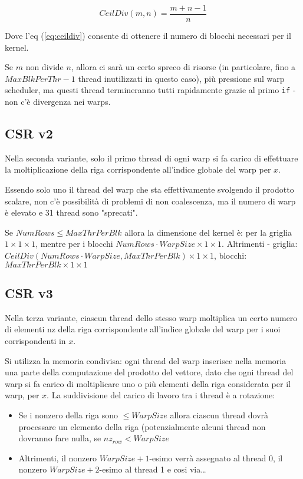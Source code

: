 \documentclass[a4paper,9pt]{extarticle}
\begin{document}
\begin{equation}\label{eq:ceildiv}
CeilDiv(m,n) = \frac{m + n - 1}{n}
\end{equation}

Dove l'eq (\ref{eq:ceildiv}) consente di ottenere il numero di blocchi necessari per il kernel.

Se $m$ non divide $n$, allora ci sarà un certo spreco di risorse 
(in particolare, fino a $MaxBlkPerThr - 1$ thread inutilizzati in questo caso), più pressione sul warp scheduler,
ma questi thread termineranno tutti rapidamente grazie al primo \texttt{if} - non c'è divergenza nei warps.

\subsection{CSR v2}
Nella seconda variante, solo il primo thread di ogni warp si fa carico di effettuare la moltiplicazione della riga 
corrispondente all'indice globale del warp per $x$.

Essendo solo uno il thread del warp che sta effettivamente svolgendo il prodotto scalare, non c'è possibilità di
problemi di non coalescenza, ma il numero di warp è elevato e 31 thread sono "sprecati".

Se $NumRows \le MaxThrPerBlk$ allora la dimensione del kernel è: per la griglia $1 \times 1 \times 1$, mentre per i
blocchi $NumRows \cdot WarpSize \times 1 \times 1$. Altrimenti - griglia: $CeilDiv(NumRows \cdot WarpSize, MaxThrPerBlk) \times 1 \times 1$, blocchi: $MaxThrPerBlk \times 1 \times 1$

\subsection{CSR v3}
Nella terza variante, ciascun thread dello stesso warp moltiplica un certo numero di elementi nz della riga corrispondente
all'indice globale del warp per i suoi corrispondenti in $x$.

Si utilizza la memoria condivisa: ogni thread del warp inserisce nella memoria una parte della computazione del prodotto
del vettore, dato che ogni thread del warp si fa carico di moltiplicare uno o più elementi della riga considerata 
per il warp, per $x$. La suddivisione del carico di lavoro tra i thread è a rotazione:
\begin{itemize}
	\item Se i nonzero della riga sono $\le WarpSize$ allora ciascun thread dovrà processare un elemento della riga
	(potenzialmente alcuni thread non dovranno fare nulla, se $nz_{row} < WarpSize$
	
	\item Altrimenti, il nonzero $WarpSize + 1$-esimo verrà assegnato al thread 0, il nonzero $WarpSize + 2$-esimo 
	al thread 1 e cosi via\dots
\end{itemize}
\end{document}
